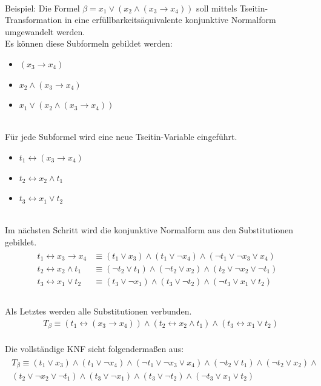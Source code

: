 \documentclass[a4,abstract=on]{scrartcl}
\begin{document}
\ \\
Beispiel: Die Formel $\beta = x_1 \vee (x_2 \wedge (x_3 \rightarrow x_4))$ soll mittels Tseitin-Transformation in eine erfüllbarkeitsäquivalente konjunktive Normalform umgewandelt werden.\\
Es können diese Subformeln gebildet werden:\\
\begin{itemize}
\item $(x_3 \rightarrow x_4)$
\item $x_2 \wedge (x_3 \rightarrow x_4)$
\item $x_1 \vee (x_2 \wedge (x_3 \rightarrow x_4))$
\end{itemize}
\ \\
Für jede Subformel wird eine neue Tseitin-Variable eingeführt.\\
\begin{itemize}
\item $t_1 \leftrightarrow (x_3 \rightarrow x_4)$
\item $t_2 \leftrightarrow x_2 \wedge t_1$
\item $t_3 \leftrightarrow x_1 \vee t_2$
\end{itemize}
\ \\
Im nächsten Schritt wird die konjunktive Normalform aus den Substitutionen gebildet.\\
\begin{align*}
\begin{aligned}
t_1 \leftrightarrow x_3 \rightarrow x_4 &\equiv (t_1 \vee  x_3) \wedge (t_1 \vee \neg x_4) \wedge (\neg t_1 \vee \neg x_3 \vee x_4)\\
t_2 \leftrightarrow x_2 \wedge t_1 &\equiv (\neg t_2 \vee  t_1) \wedge (\neg t_2 \vee x_2) \wedge (t_2 \vee \neg x_2 \vee \neg t_1)\\
t_3 \leftrightarrow x_1 \vee t_2 &\equiv (t_3 \vee  \neg x_1) \wedge (t_3 \vee \neg t_2) \wedge (\neg t_3 \vee x_1 \vee t_2)\\
\end{aligned}
\end{align*}
\ \\
Als Letztes werden alle Substitutionen verbunden.\\
\begin{align*}
& T_\beta \equiv(t_1 \leftrightarrow (x_3 \rightarrow x_4)) \wedge (t_2 \leftrightarrow x_2 \wedge t_1) \wedge (t_3 \leftrightarrow x_1 \vee t_2)
\end{align*}
\ \\
Die vollständige KNF sieht folgendermaßen aus:\\
\begin{align*}
\begin{aligned}
T_\beta \equiv (t_1 \vee  x_3) \wedge (t_1 \vee \neg x_4) \wedge (\neg t_1 \vee \neg x_3 \vee x_4) \wedge (\neg t_2 \vee  t_1) \wedge (\neg t_2 \vee x_2) \wedge \\
(t_2 \vee \neg x_2 \vee \neg t_1) \wedge (t_3 \vee  \neg x_1) \wedge (t_3 \vee \neg t_2) \wedge (\neg t_3 \vee x_1 \vee t_2)
\end{aligned}
\end{align*}
\end{document}
